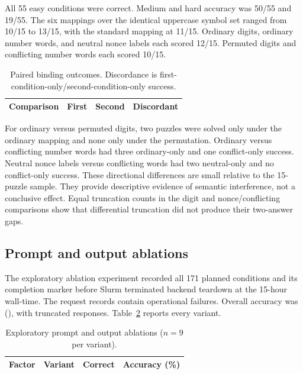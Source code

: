 \documentclass[11pt,a4paper]{article}
\begin{document}
All 55 easy conditions were correct. Medium and hard accuracy was 50/55 and 19/55. The six mappings over the identical uppercase symbol set ranged from 10/15 to 13/15, with the standard mapping at 11/15. Ordinary digits, ordinary number words, and neutral nonce labels each scored 12/15. Permuted digits and conflicting number words each scored 10/15.

\begin{table}[H]
\centering
\small
\caption{Paired binding outcomes. Discordance is first-condition-only/second-condition-only success.}
\label{tab:binding-pairs}
\begin{tabular}{lrrr}
\toprule
Comparison & First & Second & Discordant \\
\midrule
%
\end{tabular}
\end{table}

For ordinary versus permuted digits, two puzzles were solved only under the ordinary mapping and none only under the permutation. Ordinary versus conflicting number words had three ordinary-only and one conflict-only success. Neutral nonce labels versus conflicting words had two neutral-only and no conflict-only success. These directional differences are small relative to the 15-puzzle sample. They provide descriptive evidence of semantic interference, not a conclusive effect. Equal truncation counts in the digit and nonce/conflicting comparisons show that differential truncation did not produce their two-answer gaps.

\subsection{Prompt and output ablations}
The exploratory ablation experiment recorded all 171 planned conditions and its completion marker before Slurm terminated backend teardown at the 15-hour wall-time. The request records contain \AblationOperationalFailures{} operational failures. Overall accuracy was \AblationCorrect{} (\AblationAccuracy{}), with \AblationTruncations{} truncated responses. Table~\ref{tab:ablations} reports every variant.

\begin{table}[H]
\centering
\small
\caption{Exploratory prompt and output ablations ($n=9$ per variant).}
\label{tab:ablations}
\begin{tabular}{llrr}
\toprule
Factor & Variant & Correct & Accuracy (\%) \\
\midrule
%
\end{tabular}
\end{table}
\end{document}
